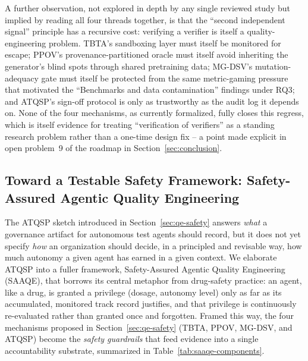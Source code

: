 A further observation, not explored in depth by any single reviewed
study but implied by reading all four threads together, is that the
``second independent signal'' principle has a recursive cost: verifying
a verifier is itself a quality-engineering problem. TBTA's sandboxing
layer must itself be monitored for escape; PPOV's provenance-partitioned
oracle must itself avoid inheriting the generator's blind spots through
shared pretraining data; MG-DSV's mutation-adequacy gate must itself be
protected from the same metric-gaming pressure that motivated the
``Benchmarks and data contamination'' findings under RQ3; and ATQSP's
sign-off protocol is only as trustworthy as the audit log it depends
on. None of the four mechanisms, as currently formalized, fully closes this
regress, which is itself evidence for treating ``verification of
verifiers'' as a standing research problem rather than a one-time
design fix -- a point made explicit in open problem~9 of the roadmap in
Section~\ref{sec:conclusion}.

\subsection{Toward a Testable Safety Framework: Safety-Assured Agentic Quality Engineering}
\label{sec:safety-framework}
The ATQSP sketch introduced in Section~\ref{sec:qe-safety} answers \emph{what} a governance artifact for
autonomous test agents should record, but it does not yet specify
\emph{how} an organization should decide, in a principled and
revisable way, how much autonomy a given agent has earned in a given
context. We elaborate ATQSP into a fuller framework, Safety-Assured
Agentic Quality Engineering (SAAQE), that borrows its central
metaphor from drug-safety practice: an agent, like a drug, is granted
a privilege (dosage, autonomy level) only as far as its accumulated,
monitored track record justifies, and that privilege is continuously
re-evaluated rather than granted once and forgotten. Framed this way,
the four mechanisms proposed in Section~\ref{sec:qe-safety} (TBTA, PPOV,
MG-DSV, and ATQSP) become the \emph{safety guardrails} that feed evidence into a
single accountability substrate, summarized in
Table~\ref{tab:saaqe-components}.

